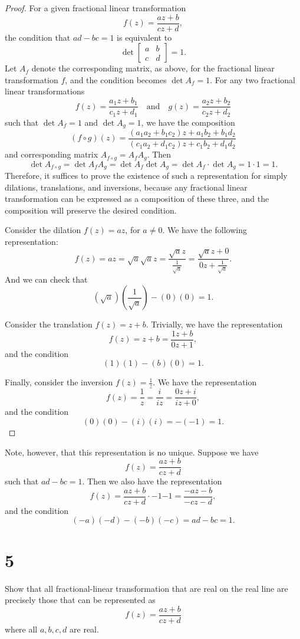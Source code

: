 \documentclass[12pt]{article}
\newenvironment{problem}
    {\begin{lrbox}{\mybox}\begin{minipage}{0.98\textwidth}}
    {\end{minipage}\end{lrbox}\framebox[\textwidth]{\usebox{\mybox}}}
\newcommand{\isp}[1]{\quad\text{#1}\quad}
\newcommand{\<}{\left\langle} %
\renewcommand{\>}{\right\rangle} %
\begin{document}
\begin{proof}
    For a given fractional linear transformation
    \[f(z) = \frac{az+b}{cz+d},\]
    the condition that $ad - bc = 1$ is equivalent to 
    \[\det\begin{bmatrix}a & b \\ c & d\end{bmatrix} = 1.\]
    Let $A_f$ denote the corresponding matrix, as above, for the fractional linear transformation $f$, and the condition becomes $\det A_f = 1$. For any two fractional linear transformations
    \[f(z) = \frac{a_1z+b_1}{c_1z+d_1} \isp{and} g(z) = \frac{a_2z+b_2}{c_2z+d_2}\]
    such that $\det A_f = 1$ and $\det A_g = 1$, we have the composition
    \[(f\circ g)(z) = \frac{(a_1a_2 + b_1c_2)z + a_1b_2 + b_1d_2}{(c_1a_2 + d_1c_2)z + c_1b_2 + d_1d_2}\]
    and corresponding matrix $A_{f\circ g} = A_fA_g$. Then
    \[\det A_{f\circ g} = \det A_fA_g = \det A_f \det A_g = \det A_f\cdot\det A_g = 1\cdot 1 = 1.\]
    Therefore, it suffices to prove the existence of such a representation for simply dilations, translations, and inversions, because any fractional linear transformation can be expressed as a composition of these three, and the composition will preserve the desired condition.
    
    Consider the dilation $f(z)=az$, for $a\ne0$. We have the following representation:
    \[f(z) = az = \sqrt{a}\sqrt{a}z = \frac{\sqrt{a}z}{\frac1{\sqrt{a}}} = \frac{\sqrt{a}z + 0}{0z + \frac1{\sqrt{a}}}.\]
    And we can check that
    \[(\sqrt{a})\left(\frac1{\sqrt{a}}\right) - (0)(0) = 1.\]
    
    Consider the translation $f(z) = z + b$. Trivially, we have the representation
    \[f(z) = z + b = \frac{1z + b}{0z + 1},\]
    and the condition
    \[(1)(1) - (b)(0) = 1.\]
    
    Finally, consider the inversion $f(z) = \frac1z$. We have the representation
    \[f(z) = \frac1z = \frac{i}{iz} = \frac{0z + i}{iz + 0},\]
    and the condition
    \[(0)(0) - (i)(i) = -(-1) = 1.\]
    
\end{proof}

Note, however, that this representation is no unique. Suppose we have
\[f(z) = \frac{az + b}{cz + d}\]
such that $ad-bc=1$. Then we also have the representation
\[f(z) = \frac{az + b}{cz + d}\cdot{-1}{-1} = \frac{-az - b}{-cz - d},\]
and the condition
\[(-a)(-d) - (-b)(-c) = ad - bc = 1.\]


\newpage
\section*{5}
\begin{problem}
    Show that all fractional-linear transformation that are real on the real line are precisely those that can be represented as
    \[f(z) = \frac{az + b}{cz + d}\]
    where all $a, b, c, d$ are real.
\end{problem}
\end{document}
